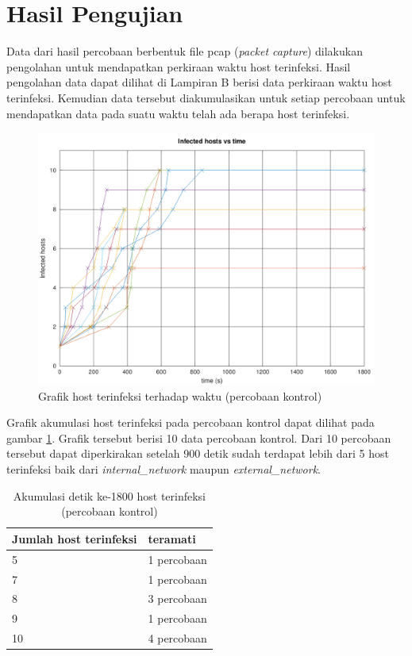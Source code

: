 \section{Hasil Pengujian}

Data dari hasil percobaan berbentuk file pcap (\textit{packet capture}) dilakukan pengolahan untuk mendapatkan perkiraan waktu host terinfeksi. Hasil pengolahan data dapat dilihat di Lampiran B berisi data perkiraan waktu host terinfeksi. Kemudian data tersebut diakumulasikan untuk setiap percobaan untuk mendapatkan data pada suatu waktu telah ada berapa host terinfeksi.

\begin{figure}[H]
	\centering
	\includegraphics[width=\textwidth]{resources/infection_control_over_time.png}
	\caption{Grafik host terinfeksi terhadap waktu (percobaan kontrol)}
	\label{fig:infection_control_over_time}
\end{figure}

Grafik akumulasi host terinfeksi pada percobaan kontrol dapat dilihat pada gambar \ref{fig:infection_control_over_time}. Grafik tersebut berisi 10 data percobaan kontrol. Dari 10 percobaan tersebut dapat diperkirakan setelah 900 detik sudah terdapat lebih dari 5 host terinfeksi baik dari \textit{internal\_network} maupun \textit{external\_network}.

\begin{table}[H]
	\caption{Akumulasi detik ke-1800 host terinfeksi (percobaan kontrol)}
	\label{table:1800s_all_network_control}
	\begin{center}
		\begin{tabularx}{300px}{|X|r|}
			\hline
			\multicolumn{1}{|l}{\textbf{Jumlah host terinfeksi}} & \multicolumn{1}{|l|}{\textbf{teramati}} \\ \hline
			5 & 1 percobaan\\ \hline
			7 & 1 percobaan\\ \hline
			8 & 3 percobaan\\ \hline
			9 & 1 percobaan\\ \hline
			10 & 4 percobaan\\ \hline
		\end{tabularx}
	\end{center}
\end{table}


